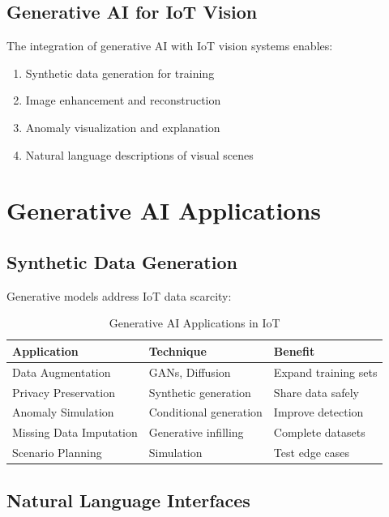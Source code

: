 \documentclass[12pt,a4paper]{article}
\begin{document}
\subsection{Generative AI for IoT Vision}

The integration of generative AI with IoT vision systems enables:
\begin{enumerate}
    \item Synthetic data generation for training
    \item Image enhancement and reconstruction
    \item Anomaly visualization and explanation
    \item Natural language descriptions of visual scenes
\end{enumerate}

\section{Generative AI Applications}

\subsection{Synthetic Data Generation}

Generative models address IoT data scarcity:

\begin{table}[H]
\centering
\caption{Generative AI Applications in IoT}
\begin{tabular}{lll}
\toprule
\textbf{Application} & \textbf{Technique} & \textbf{Benefit} \\
\midrule
Data Augmentation & GANs, Diffusion & Expand training sets \\
Privacy Preservation & Synthetic generation & Share data safely \\
Anomaly Simulation & Conditional generation & Improve detection \\
Missing Data Imputation & Generative infilling & Complete datasets \\
Scenario Planning & Simulation & Test edge cases \\
\bottomrule
\end{tabular}
\end{table}

\subsection{Natural Language Interfaces}
\end{document}
